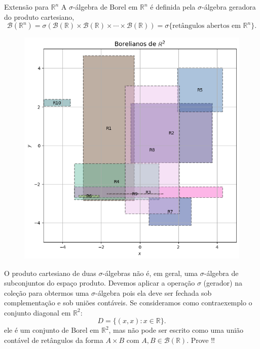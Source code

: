 \begin{frame}{Extensão para $\mathbb{R}^n$}
	A $\sigma$-álgebra de Borel em $\mathbb{R}^n$ é definida pela $\sigma$-álgebra geradora do produto cartesiano, $$\mathcal{B}(\mathbb{R}^n) = \sigma(\mathcal{B}(\mathbb{R}) \times \mathcal{B}(\mathbb{R}) \times \cdots \times \mathcal{B}(\mathbb{R})) = \sigma\{\text{retângulos abertos em } \mathbb{R}^n\}.$$


			\begin{figure}[!htb]
	\begin{center}
		\includegraphics[scale=0.2]{BorelianosR2.png}
	\end{center}
\end{figure}

\vspace{-0.5cm}
\begin{nota}\small
	O produto cartesiano de duas $\sigma$-álgebras não é, em geral, uma $\sigma$-álgebra de subconjuntos do espaço produto. Devemos aplicar a operação $\sigma$ (gerador) na coleção para obtermos uma $\sigma$-álgebra pois ela deve ser fechada sob complementação e sob uniões contáveis. Se  consideramos como contraexemplo o conjunto diagonal em $\mathbb{R}^2$:
	\[
	D = \{ (x, x) : x \in \mathbb{R} \}.
	\]
	ele é um conjunto de Borel em $\mathbb{R}^2$, mas não pode ser escrito como uma união contável de retângulos da forma $A \times B$ com $A, B \in \mathcal{B}(\mathbb{R})$. Prove !!
	

\end{nota}
\end{frame}

